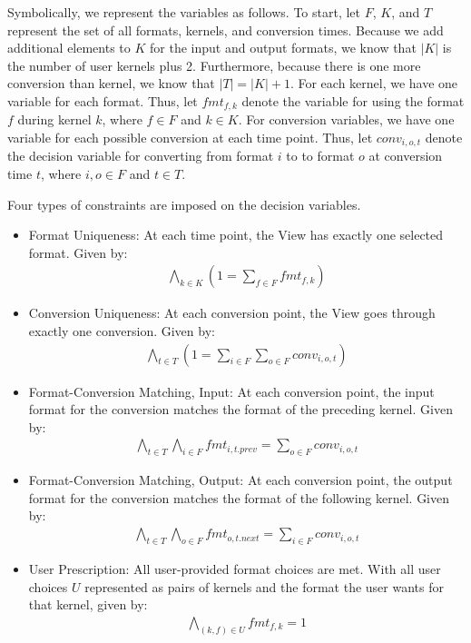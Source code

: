 \documentclass[sigconf]{acmart}
\begin{document}
Symbolically, we represent the variables as follows.
To start, let $F$, $K$, and $T$ represent the set of all formats, kernels, and conversion times.
Because we add additional elements to $K$ for the input and output formats, we know that $|K|$ is the number of user kernels plus 2.
Furthermore, because there is one more conversion than kernel, we know that $|T| = |K| + 1$.
For each kernel, we have one variable for each format. 
Thus, let $fmt_{f,k}$ denote the variable for using the format $f$ during kernel $k$, where $f \in F$ and $k \in K$.
For conversion variables, we have one variable for each possible conversion at each time point. 
Thus, let $conv_{i,o,t}$ denote the decision variable for converting from format $i$ to to format $o$ at conversion time $t$, where $i,o \in F$ and $t \in T$.

Four types of constraints are imposed on the decision variables.
\begin{itemize}
\item Format Uniqueness: At each time point, the View has exactly one selected format. Given by: 
\begin{align*}
	\bigwedge\limits_{k \in K} (1 = \sum\limits_{f \in F} fmt_{f,k})
\end{align*}
\item Conversion Uniqueness: At each conversion point, the View goes through exactly one conversion. Given by:
\begin{align*}
	\bigwedge\limits_{t \in T} (1 = \sum\limits_{i \in F}\sum\limits_{o \in F} conv_{i,o,t})
\end{align*}
\item Format-Conversion Matching, Input: At each conversion point, the input format for the conversion matches the format of the preceding kernel. Given by:
\begin{align*}
	\bigwedge\limits_{t \in T} \bigwedge\limits_{i \in F} fmt_{i,t.prev} = \sum\limits_{o \in F} conv_{i,o,t}
\end{align*}
\item Format-Conversion Matching, Output: At each conversion point, the output format for the conversion matches the format of the following kernel. Given by:
\begin{align*}
	\bigwedge\limits_{t \in T} \bigwedge\limits_{o \in F} fmt_{o,t.next} = \sum\limits_{i \in F} conv_{i,o,t}
\end{align*}
\item User Prescription: All user-provided format choices are met. With all user choices $U$ represented as pairs of kernels and the format the user wants for that kernel, given by:
\begin{align*}
	\bigwedge\limits_{(k,f) \in U}  fmt_{f,k} = 1
\end{align*}
\end{itemize}
\end{document}
